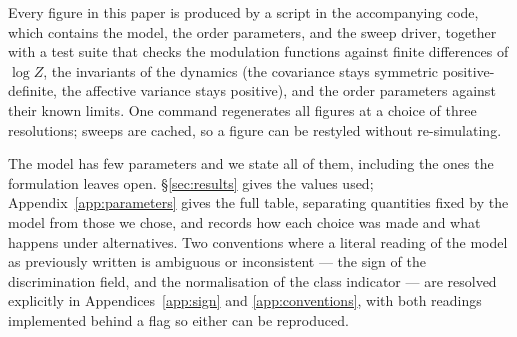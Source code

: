 Every figure in this paper is produced by a script in the accompanying code,
which contains the model, the order parameters, and the sweep driver, together
with a test suite that checks the modulation functions against finite differences
of $\log Z$, the invariants of the dynamics (the covariance stays symmetric
positive-definite, the affective variance stays positive), and the order
parameters against their known limits. One command regenerates all figures at a
choice of three resolutions; sweeps are cached, so a figure can be restyled
without re-simulating.

The model has few parameters and we state all of them, including the ones the
formulation leaves open. \S\ref{sec:results} gives the values used;
Appendix~\ref{app:parameters} gives the full table, separating quantities fixed
by the model from those we chose, and records how each choice was made and what
happens under alternatives. Two conventions where a literal reading of the model
as previously written is ambiguous or inconsistent --- the sign of the
discrimination field, and the normalisation of the class indicator --- are
resolved explicitly in Appendices~\ref{app:sign} and \ref{app:conventions}, with
both readings implemented behind a flag so either can be reproduced.
